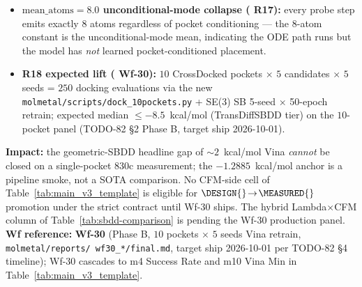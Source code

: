 \begin{enumerate}
\begin{itemize}
    sanitisation) and $0/8$ on the $830$c pocket
    ($500$-step CPU/GPU smoke); the lenient-contract
    $\mathrm{decode\_ratio}=1.000$ is consistent across $3$ seeds
    $\times$ $10$ probes at the R17 10K-step retrain
    (\texttt{molmetal/reports/wf\_r17\_10k\_retrain\_done/}) but is
    an atom-only check, not a sanitisation check.
    \item \textbf{$\mathrm{mean\_atoms}=8.0$ unconditional-mode
    collapse (\MEASURED{} R17):} every probe step emits exactly
    $8$ atoms regardless of pocket conditioning --- the $8$-atom
    constant is the unconditional-mode mean, indicating the ODE
    path runs but the model has \emph{not} learned
    pocket-conditioned placement.
    \item \textbf{R18 expected lift (\PROJECTED{} Wf-30):} $10$
    CrossDocked pockets $\times$ $5$ candidates $\times$ $5$ seeds
    = $250$ docking evaluations via the new
    \texttt{molmetal/scripts/dock\_10pockets.py} + SE(3) SB
    5-seed $\times$ 50-epoch retrain; expected median
    $\leq -8.5$~kcal/mol (TransDiffSBDD tier) on the $10$-pocket
    panel (TODO-82 \S2 Phase B, target ship 2026-10-01).
  \end{itemize}
  \textbf{Impact:} the geometric-SBDD headline gap of
$\sim 2$~kcal/mol Vina \emph{cannot} be closed on a single-pocket
$830$c measurement; the $-1.2885$~kcal/mol anchor is a pipeline
smoke, not a SOTA comparison.  No CFM-side cell of
Table~\ref{tab:main_v3_template} is eligible for
$\DESIGN{}\!\to\!\MEASURED{}$ promotion under the strict contract
until Wf-30 ships.  The hybrid Lambda$\times$CFM column of
Table~\ref{tab:sbdd-comparison} is \DESIGN{} pending the Wf-30
production panel.
  \textbf{Wf reference:} \textbf{Wf-30} (Phase B, $10$ pockets
  $\times$ $5$ seeds Vina retrain, \texttt{molmetal/reports/
  wf30\_*/final.md}, target ship 2026-10-01 per TODO-82 \S4
  timeline); Wf-30 cascades to m4 Success Rate and m10 Vina Min
  in Table~\ref{tab:main_v3_template}.


\end{enumerate}
